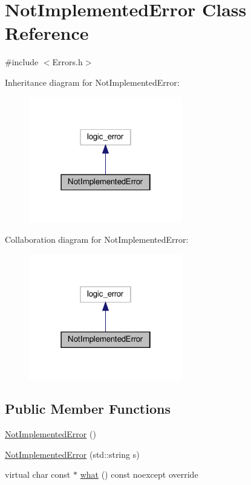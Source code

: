 \hypertarget{class_not_implemented_error}{}\section{Not\+Implemented\+Error Class Reference}
\label{class_not_implemented_error}


{\ttfamily \#include $<$Errors.\+h$>$}



Inheritance diagram for Not\+Implemented\+Error\+:
\nopagebreak
\begin{figure}[H]
\begin{center}
\leavevmode
\includegraphics[width=190pt]{class_not_implemented_error__inherit__graph}
\end{center}
\end{figure}


Collaboration diagram for Not\+Implemented\+Error\+:
\nopagebreak
\begin{figure}[H]
\begin{center}
\leavevmode
\includegraphics[width=190pt]{class_not_implemented_error__coll__graph}
\end{center}
\end{figure}
\subsection*{Public Member Functions}
\begin{DoxyCompactItemize}
\item 
\hyperlink{class_not_implemented_error_a715a224ab50633f41010e22d2033e6d8}{Not\+Implemented\+Error} ()
\item 
\hyperlink{class_not_implemented_error_a0fc1c5e8d9ea2da187ca3ddf0e65e8e9}{Not\+Implemented\+Error} (std\+::string s)
\item 
virtual char const  $\ast$ \hyperlink{class_not_implemented_error_a338a926dcaa356ac1b33cc0d7a093351}{what} () const noexcept override
\end{DoxyCompactItemize}


